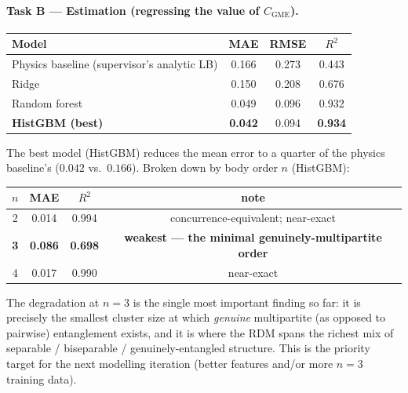 \documentclass[11pt]{article}
\newcommand{\CGME}{\ensuremath{C_{\mathrm{GME}}}}
\begin{document}
\paragraph{Task B --- Estimation (regressing the value of \CGME{}).}
\begin{center}
\begin{tabular}{@{}lccc@{}}
\toprule
Model & MAE & RMSE & $R^2$ \\
\midrule
Physics baseline (supervisor's analytic LB) & 0.166 & 0.273 & 0.443 \\
Ridge                    & 0.150 & 0.208 & 0.676 \\
Random forest            & 0.049 & 0.096 & 0.932 \\
\textbf{HistGBM (best)}  & \textbf{0.042} & 0.094 & \textbf{0.934} \\
\bottomrule
\end{tabular}
\end{center}
The best model (HistGBM) reduces the mean error to a quarter of the physics
baseline's ($0.042$ vs.\ $0.166$). Broken down by body order $n$ (HistGBM):
\begin{center}
\begin{tabular}{@{}cccc@{}}
\toprule
$n$ & MAE & $R^2$ & note \\
\midrule
2 & 0.014 & 0.994 & concurrence-equivalent; near-exact \\
\textbf{3} & \textbf{0.086} & \textbf{0.698} & \textbf{weakest --- the minimal genuinely-multipartite order} \\
4 & 0.017 & 0.990 & near-exact \\
\bottomrule
\end{tabular}
\end{center}
The degradation at $n=3$ is the single most important finding so far: it is
precisely the smallest cluster size at which \emph{genuine} multipartite
(as opposed to pairwise) entanglement exists, and it is where the RDM spans the
richest mix of separable / biseparable / genuinely-entangled structure. This is
the priority target for the next modelling iteration (better features and/or
more $n=3$ training data).

\end{document}
